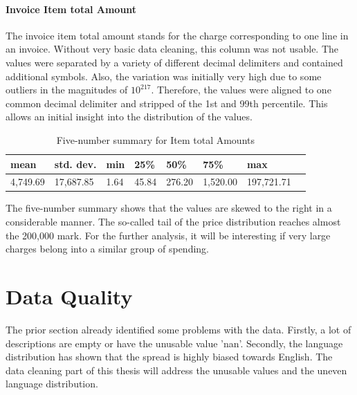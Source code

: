 \paragraph{Invoice Item total Amount}
The invoice item total amount stands for the charge corresponding to one line in an invoice. Without very basic data cleaning, this column was not usable. The values were separated by a variety of different decimal delimiters and contained additional symbols. Also, the variation was initially very high due to some outliers in the magnitudes of $10^{217}$. Therefore, the values were aligned to one common decimal delimiter and stripped of the 1st and 99th percentile. This allows an initial insight into the distribution of the values.

\begin{table}[!h]
	\caption{Five-number summary for Item total Amounts}
	\centering
	\begin{tabular}{llllllll}
		\toprule
		 \textbf{mean} & \textbf{std. dev.} & \textbf{min} & \textbf{25\%} & \textbf{50\%} & \textbf{75\%} & \textbf{max} \\
		\midrule
		  4,749.69      & 17,687.85          & 1.64         & 45.84         & 276.20        & 1,520.00      & 197,721.71  \\
		\bottomrule
	\end{tabular}
\end{table}

The five-number summary shows that the values are skewed to the right in a considerable manner. The so-called tail of the price distribution reaches almost the 200,000 mark. For the further analysis, it will be interesting if very large charges belong into a similar group of spending.

\section{Data Quality}
The prior section already identified some problems with the data. Firstly, a lot of descriptions are empty or have the unusable value 'nan'. Secondly, the language distribution has shown that the spread is highly biased towards English. 
The data cleaning part of this thesis will address the unusable values and the uneven language distribution.

